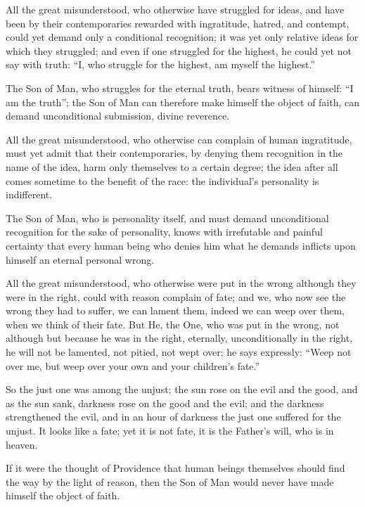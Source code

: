 \documentclass[12pt,a4paper,openany]{book}
\newcommand{\opage}[1]{\marginnote{\footnotesize\textit{[#1]}}}
\begin{document}
All the great misunderstood, who otherwise have
\setcounter{footnote}{0}%
\opage{26}struggled for ideas, and have been by their contemporaries
rewarded with ingratitude, hatred, and contempt, could yet
demand only a conditional recognition; it was
yet only relative ideas for which they struggled; and
even if one struggled for the highest, he could
yet not say with truth: ``I, who struggle
for the highest, am myself the highest.''

The Son of Man, who struggles for the eternal
truth, bears witness of himself: ``I am the truth'';
the Son of Man can therefore make himself
the object of faith, can demand unconditional
submission, divine reverence.

All the great misunderstood, who otherwise can
complain of human ingratitude, must
yet admit that their contemporaries, by denying
them recognition in the name of the idea, harm
only themselves to a certain degree; the idea after all
comes sometime to the benefit of the race: the individual's
personality is indifferent.

The Son of Man, who is personality
itself, and must demand unconditional recognition for
the sake of personality, knows with irrefutable
and painful certainty that every human being who
denies him what he demands inflicts upon himself
an eternal personal wrong.

\setcounter{footnote}{0}%
\opage{27}All the great misunderstood, who otherwise were put in the wrong
although they were in the right, could with reason
complain of fate; and we, who now see the
wrong they had to suffer, we can lament them, indeed
we can weep over them, when we think of
their fate. But He, the One, who was put in the
wrong, not although but because he was in the
right, eternally, unconditionally in the right, he will not be lamented,
not pitied, not wept over; he says expressly:
``Weep not over me, but weep
over your own and your children's fate.''

So the just one was among the unjust;
the sun rose on the evil and the good, and
as the sun sank, darkness rose on the good and
the evil; and the darkness strengthened the evil, and in an
hour of darkness the just one suffered for the
unjust. It looks like a fate;
yet it is not fate, it is the Father's will,
who is in heaven.

If it were the thought of Providence that human beings
themselves should find the way by the light of
reason, then the Son of Man would never have made
himself the object of faith.
\end{document}
